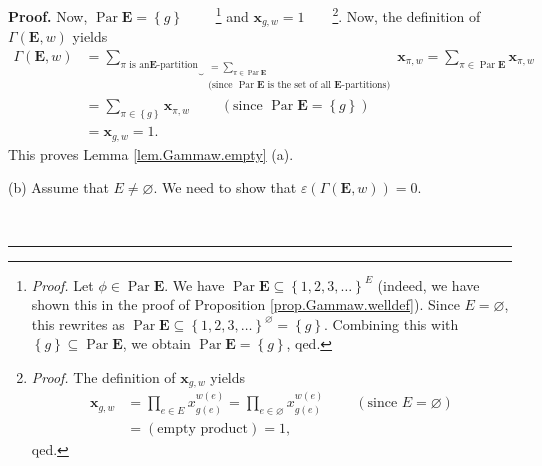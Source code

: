 \documentclass[numbers=enddot,12pt,final,onecolumn,notitlepage,abstracton]{scrartcl}
\theoremstyle{definition}
\newenvironment{proof}[1][Proof]{\noindent\textbf{#1.} }{\ \rule{0.5em}{0.5em}}
\let\sumnonlimits\sum
\let\prodnonlimits\prod
\renewcommand{\sum}{\sumnonlimits\limits}
\renewcommand{\prod}{\prodnonlimits\limits}
\newenvironment{verlong}{}{}
\begin{document}
\begin{verlong}
\begin{footnotesize}
\begin{proof}
Now, $\operatorname*{Par}\mathbf{E}=\left\{  g\right\}  $%
\ \ \ \ \footnote{\textit{Proof.} Let $\phi\in\operatorname*{Par}\mathbf{E}$.
We have $\operatorname*{Par}\mathbf{E}\subseteq\left\{  1,2,3,\ldots\right\}
^{E}$ (indeed, we have shown this in the proof of Proposition
\ref{prop.Gammaw.welldef}). Since $E = \varnothing$, this rewrites as
$\operatorname*{Par}\mathbf{E}\subseteq\left\{  1,2,3,\ldots\right\}
^{\varnothing} = \left\{  g\right\}  $. Combining this with $\left\{
g\right\}  \subseteq\operatorname*{Par}\mathbf{E}$, we obtain
$\operatorname*{Par}\mathbf{E}=\left\{  g\right\}  $, qed.} and $\mathbf{x}%
_{g,w}=1$\ \ \ \ \footnote{\textit{Proof.} The definition of $\mathbf{x}%
_{g,w}$ yields
\begin{align*}
{\mathbf{x}}_{g,w}  &  =\prod_{e\in E}x_{g\left(  e\right)  }^{w\left(
e\right)  }=\prod_{e\in\varnothing}x_{g\left(  e\right)  }^{w\left(  e\right)
}\ \ \ \ \ \ \ \ \ \ \left(  \text{since }E=\varnothing\right) \\
&  =\left(  \text{empty product}\right)  =1,
\end{align*}
qed.}. Now, the definition of $\Gamma\left(  \mathbf{E},w\right)  $ yields%
\begin{align*}
\Gamma\left(  {\mathbf{E}},w\right)   &  =\underbrace{\sum_{\pi\text{ is an
}{\mathbf{E}}\text{-partition}}}_{\substack{=\sum_{\pi\in\operatorname*{Par}%
\mathbf{E}}\\\text{(since }\operatorname*{Par}\mathbf{E}\text{ is the set of
all }\mathbf{E}\text{-partitions)}}}{\mathbf{x}}_{\pi,w}=\sum_{\pi
\in\operatorname*{Par}\mathbf{E}}\mathbf{x}_{\pi,w}\\
&  =\sum_{\pi\in\left\{  g\right\}  }\mathbf{x}_{\pi,w}%
\ \ \ \ \ \ \ \ \ \ \left(  \text{since }\operatorname*{Par}\mathbf{E}%
=\left\{  g\right\}  \right) \\
&  =\mathbf{x}_{g,w}=1.
\end{align*}
This proves Lemma \ref{lem.Gammaw.empty} (a).

(b) Assume that $E\neq\varnothing$. We need to show that $\varepsilon\left(
\Gamma\left(  \mathbf{E},w\right)  \right)  =0$.


\end{proof}
\end{footnotesize}
\end{verlong}
\end{document}
